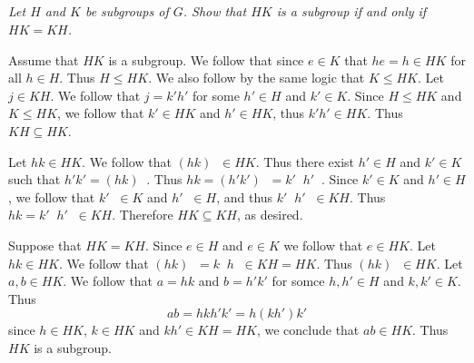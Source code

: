 \documentclass[11pt,oneside,titlepage]{book}
\DeclareMathOperator \inv {^{-1}}
\begin{document}
\subsection{}

\textit{Let $H$ and $K$ be subgroups of $G$. Show that $HK$ is a subgroup if and only if
  $HK = KH$.}

Assume that $HK$ is a subgroup. We follow that since $e \in K$ that $he = h \in HK$ for all
$h \in H$. Thus $H \leq HK$. We also follow by the same logic that $K \leq HK$.
Let $j \in KH$. We follow that $j = k'h'$ for some $h' \in H$ and $k' \in K$. 
Since $H \leq HK$ and $K \leq HK$, we follow that
$k' \in HK$ and $h' \in HK$, thus $k'h' \in HK$. Thus $KH \subseteq HK$.

Let $hk \in HK$. We follow that $(hk)\inv \in HK$. Thus there exist $h' \in H$
and $k' \in K$ such that $h'k' = (hk)\inv$. Thus $hk = (h'k')\inv = k'\inv h'\inv$.
Since $k' \in K$ and $h' \in H$, we follow that $k'\inv \in K$ and $h'\inv \in H$,
and thus $k'\inv h'\inv \in KH$. Thus $hk = k'\inv h'\inv \in KH$. Therefore $HK \subseteq KH$,
as desired.

Suppose that $HK = KH$. Since $e \in H$ and $e \in K$ we follow that $e \in HK$.
Let $hk \in HK$. We follow that
$(hk)\inv = k\inv h\inv \in KH = HK$. Thus $(hk)\inv \in HK$.
Let $a, b \in HK$. We follow that $a = hk$ and $b = h'k'$ for somce $h, h' \in H$
and $k, k' \in K$. Thus
$$ab = hkh'k' = h(kh')k'$$
since $h \in HK$, $k \in HK$ and $kh' \in KH = HK$, we conclude that $ab \in HK$.
Thus $HK$ is a subgroup.
\end{document}
